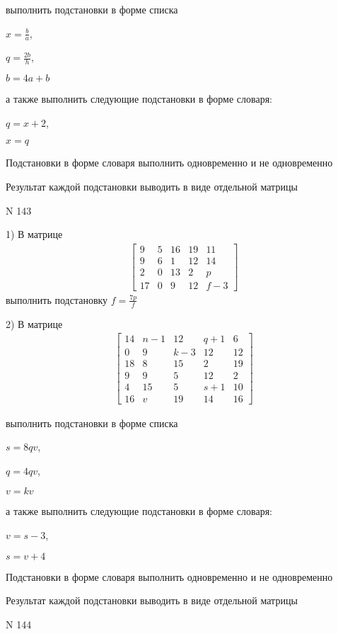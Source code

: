 \documentclass[11pt]{report}
\begin{document}
выполнить подстановки в форме списка

$x=\frac{b}{a}$,

$q=\frac{2 b}{h}$,

$b=4 a + b$

а также выполнить следующие подстановки в форме словаря:

$q=x + 2$,

$x=q$


    Подстановки в форме словаря выполнить одновременно и не одновременно


    Результат каждой подстановки выводить в виде отдельной матрицы

\newpage
N 143


    1) В матрице
\begin{align*}
\left[\begin{matrix}9 & 5 & 16 & 19 & 11\\9 & 6 & 1 & 12 & 14\\2 & 0 & 13 & 2 & p\\17 & 0 & 9 & 12 & f - 3\end{matrix}\right]
\end{align*}
выполнить подстановку $f=\frac{7 p}{f}$


    2) В матрице
\begin{align*}
\left[\begin{matrix}14 & n - 1 & 12 & q + 1 & 6\\0 & 9 & k - 3 & 12 & 12\\18 & 8 & 15 & 2 & 19\\9 & 9 & 5 & 12 & 2\\4 & 15 & 5 & s + 1 & 10\\16 & v & 19 & 14 & 16\end{matrix}\right]
\end{align*}

выполнить подстановки в форме списка

$s=8 q v$,

$q=4 q v$,

$v=k v$

а также выполнить следующие подстановки в форме словаря:

$v=s - 3$,

$s=v + 4$


    Подстановки в форме словаря выполнить одновременно и не одновременно


    Результат каждой подстановки выводить в виде отдельной матрицы

\newpage
N 144
\end{document}
